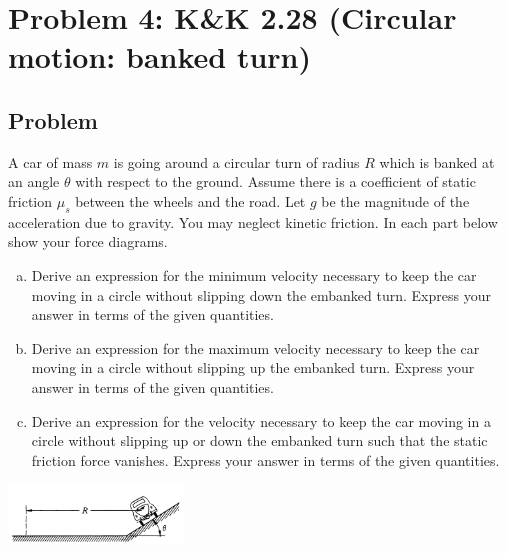 \documentclass[solutions]{esg8012pset}
\begin{document}
\section*{Problem 4: K\&K 2.28 (Circular motion: banked turn)}
\subsection*{Problem}
  A car of mass $m$ is going around a circular turn of radius $R$ which is banked at an angle $\theta$ with respect to the ground. Assume there is a coefficient of static friction $\mu_s$ between the wheels and the road. Let $g$ be the magnitude of the acceleration due to gravity. You may neglect kinetic friction. In each part below show your force diagrams.
  \begin{enumerate}[a)]
    \item Derive an expression for the minimum velocity necessary to keep the car moving in a circle without slipping down the embanked turn. Express your answer in terms of the given quantities.
    \item Derive an expression for the maximum velocity necessary to keep the car moving in a circle without slipping up the embanked turn. Express your answer in terms of the given quantities.
    \item Derive an expression for the velocity necessary to keep the car moving in a circle without slipping up or down the embanked turn such that the static friction force vanishes. Express your answer in terms of the given quantities.
  \end{enumerate}
  \begin{center}\includegraphics[width=0.35\textwidth]{ps03_3}\end{center}
\end{document}
